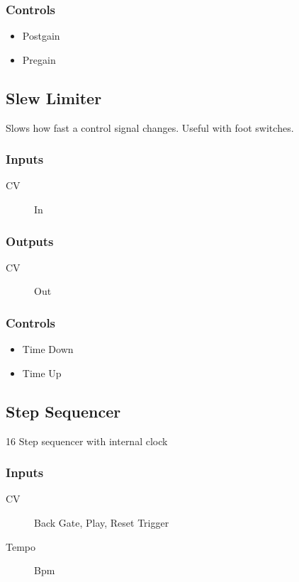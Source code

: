 \subsubsection{Controls}
\begin{itemize}
\item Postgain
\item Pregain
\end{itemize}

\subsection{Slew Limiter}

Slows how fast a control signal changes. Useful with foot switches.



\subsubsection{Inputs}
\begin{description}
\item [CV] In
\end{description}

\subsubsection{Outputs}
\begin{description}
\item [CV] Out
\end{description}

\subsubsection{Controls}
\begin{itemize}
\item Time Down
\item Time Up
\end{itemize}

\subsection{Step Sequencer}

16 Step sequencer with internal clock



\subsubsection{Inputs}
\begin{description}
\item [CV] Back Gate, Play, Reset Trigger
\item [Tempo] Bpm
\end{description}

